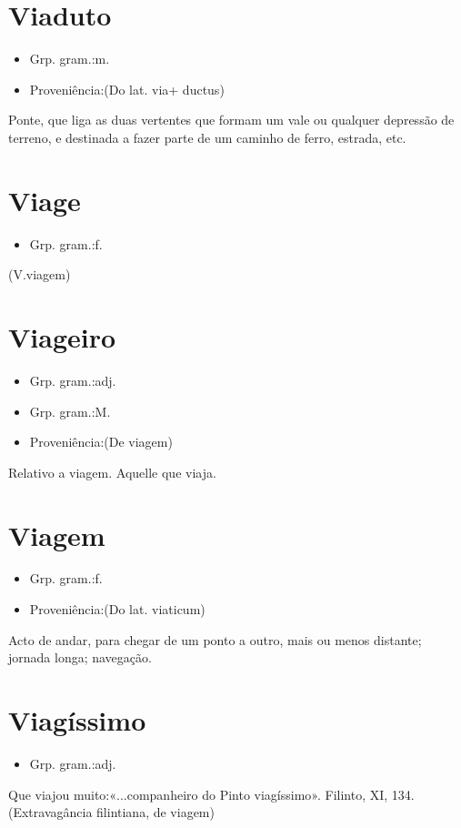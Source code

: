 \documentclass{article}
\begin{document}
\section{Viaduto}
\begin{itemize}
\item {Grp. gram.:m.}
\end{itemize}
\begin{itemize}
\item {Proveniência:(Do lat. \textunderscore via\textunderscore  + \textunderscore ductus\textunderscore )}
\end{itemize}
Ponte, que liga as duas vertentes que formam um vale ou qualquer depressão de terreno, e destinada a fazer parte de um caminho de ferro, estrada, etc.
\section{Viage}
\begin{itemize}
\item {Grp. gram.:f.}
\end{itemize}
(V.viagem)
\section{Viageiro}
\begin{itemize}
\item {Grp. gram.:adj.}
\end{itemize}
\begin{itemize}
\item {Grp. gram.:M.}
\end{itemize}
\begin{itemize}
\item {Proveniência:(De \textunderscore viagem\textunderscore )}
\end{itemize}
Relativo a viagem.
Aquelle que viaja.
\section{Viagem}
\begin{itemize}
\item {Grp. gram.:f.}
\end{itemize}
\begin{itemize}
\item {Proveniência:(Do lat. \textunderscore viaticum\textunderscore )}
\end{itemize}
Acto de andar, para chegar de um ponto a outro, mais ou menos distante; jornada longa; navegação.
\section{Viagíssimo}
\begin{itemize}
\item {Grp. gram.:adj.}
\end{itemize}
Que viajou muito:«\textunderscore ...companheiro do Pinto viagíssimo\textunderscore ». Filinto, XI, 134.
(Extravagância filintiana, de \textunderscore viagem\textunderscore )
\end{document}
